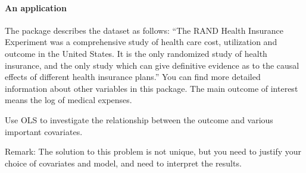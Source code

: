  


\paragraph{An application}

The  package  \citep{toomet2008sample} describes the dataset  as follows: ``The RAND Health Insurance Experiment was a comprehensive study of health care cost, utilization and outcome in the United States. It is the only randomized study of health insurance, and the only study which can give definitive evidence as to the causal effects of different health insurance plans.'' You can find more detailed information about other variables in this package. The main outcome of interest  means the log of medical expenses. 

Use OLS to investigate the relationship between the outcome and various important covariates. 

Remark: The solution to this problem is not unique, but you need to justify your choice of covariates and model, and need to interpret the results. 

